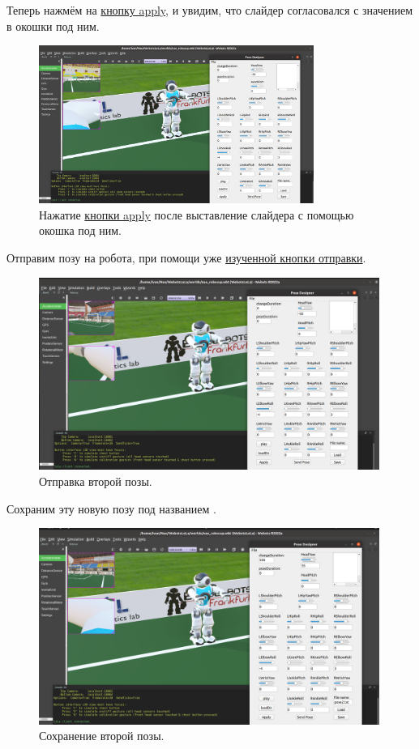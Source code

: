 \documentclass[12pt,a4paper]{article}
\begin{document}
\noindent Теперь нажмём на \hyperref[apply]{кнопку apply}, и увидим, что слайдер согласовался с значением в окошки под ним.
\begin{figure}[h!]
    \centering
    \includegraphics[width = 0.8\textwidth]{./images/applyClick.png}
    \caption{Нажатие \hyperref[apply]{кнопки apply} после выставление слайдера с помощью окошка под ним.}
    \label{fig:my_label}
\end{figure}
\newpage
\noindent Отправим позу на робота, при помощи уже \hyperref[sendPose]{изученной кнопки отправки}.
\begin{figure}[h!]
    \centering
    \includegraphics[width = 0.99\textwidth]{./images/secondTurn.png}
    \caption{Отправка второй позы.}
    \label{fig:my_label}
\end{figure}

Сохраним эту новую позу под названием .
\begin{figure}[h!]
    \centering
    \includegraphics[width = 0.99\textwidth]{./images/secondSave.png}
    \caption{Сохранение второй позы.}
    \label{fig:my_label}
\end{figure}
\newpage
\end{document}

